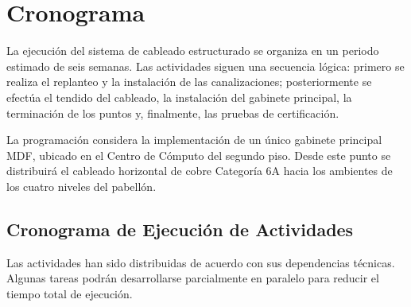 
\chapter{Cronograma}
\label{chap:cronograma}

La ejecución del sistema de cableado estructurado se organiza en un periodo estimado de seis semanas. Las actividades siguen una secuencia lógica: primero se realiza el replanteo y la instalación de las canalizaciones; posteriormente se efectúa el tendido del cableado, la instalación del gabinete principal, la terminación de los puntos y, finalmente, las pruebas de certificación.

La programación considera la implementación de un único gabinete principal MDF, ubicado en el Centro de Cómputo del segundo piso. Desde este punto se distribuirá el cableado horizontal de cobre Categoría 6A hacia los ambientes de los cuatro niveles del pabellón.

\section{Cronograma de Ejecución de Actividades}

Las actividades han sido distribuidas de acuerdo con sus dependencias técnicas. Algunas tareas podrán desarrollarse parcialmente en paralelo para reducir el tiempo total de ejecución.

\begin{table}[H]
\centering
\caption{Cronograma de ejecución de actividades.}
\label{tab:cronograma}
\end{table}

